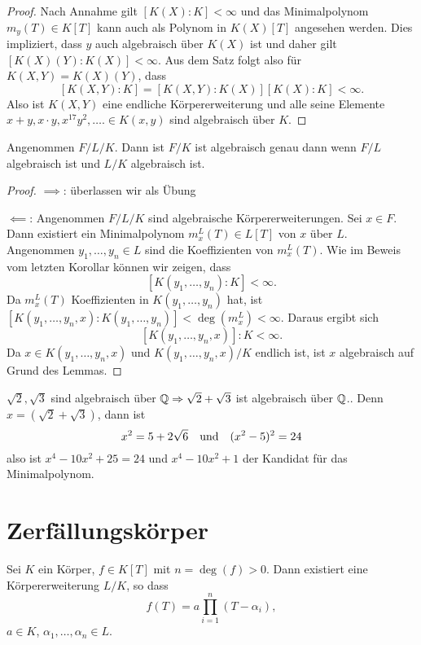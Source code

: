\begin{proof}
	Nach Annahme gilt $[K(X) : K] < \infty$ und das Minimalpolynom $m_{y}(T) \in K[T]$ kann auch als
	Polynom in $K(X)[T]$ angesehen werden. Dies impliziert, dass $y$ auch algebraisch über $K(X)$ ist
	und daher gilt $[K(X)(Y) : K(X)] < \infty$. Aus dem Satz folgt also für $K(X,Y) = K(X)(Y)$, dass
	\[
		[K(X,Y):K] = [K(X,Y) : K(X)] [K(X) : K] < \infty
	.\] 
	Also ist $K(X,Y)$ eine endliche Körpererweiterung und alle seine Elemente
	$x+y, x\cdot y, x^{17} y^2, \ldots. \in K(x,y)$ sind algebraisch über $K$.
\end{proof}

\begin{corollary}
	Angenommen $F / L / K$. Dann ist $F / K $ ist algebraisch genau dann wenn  $F / L$ algebraisch ist und $L / K$ algebraisch ist.
\end{corollary}

\begin{proof}
	$\implies$: überlassen wir als Übung

	$\impliedby$: Angenommen $F / L / K$ sind algebraische Körpererweiterungen. 
	Sei $x \in F$. Dann existiert ein Minimalpolynom $m_{x}^{L}(T) \in L[T]$ von $x$ über $L$.
	Angenommen $y_1,\ldots,y_{n} \in L$ sind die Koeffizienten von $m_{x}^{L}(T)$. Wie im Beweis vom letzten Korollar können wir zeigen, dass 
	\[
		[K(y_1,\ldots,y_{n}) : K] < \infty
	.\] 
	Da $m_{x}^{L}(T)$ Koeffizienten in $K(y_1,\ldots,y_{n})$ hat, ist $[K(y_1,\ldots,y_{n},x) : K(y_1,\ldots,y_{n})] < \deg(m_{x}^{L}) < \infty$.
	Daraus ergibt sich
	\[
		[K(y_1,\ldots,y_{n},x)] : K < \infty
	.\] 
	Da $x \in K(y_1,\ldots,y_{n},x)$ und $K(y_1,\ldots,y_{n},x) / K$ endlich ist, ist $x$ algebraisch auf Grund des Lemmas.
\end{proof}

\begin{eg}
	$\sqrt{2}, \sqrt{3}$ sind algebraisch über $\mathbb{Q} \Rightarrow \sqrt{2} + \sqrt{3}$ ist algebraisch über $\mathbb{Q}$..
	Denn $x = (\sqrt{2} +\sqrt{3} )$, dann ist 
	\[
		x^2 = 5 + 2 \sqrt{6} \qq{und} (x^2 - 5)^2 = 24
	\] 
	also ist $x^{4} - 10 x^2 + 25 = 24$ und $x^{4} - 10 x^2 + 1$ der Kandidat für das Minimalpolynom.
\end{eg}

\section{Zerfällungskörper}

\begin{theorem}[Kronecker]
	Sei $K$ ein Körper, $f \in K[T]$ mit $n = \deg(f) > 0$. Dann existiert eine Körpererweiterung $L / K$, so dass
	\[
		f(T) = a \prod_{i=1}^{n} (T-\alpha_{i}),
	\] 
	$a \in K$, $\alpha_1,\ldots,\alpha_{n} \in L$.
\end{theorem}

